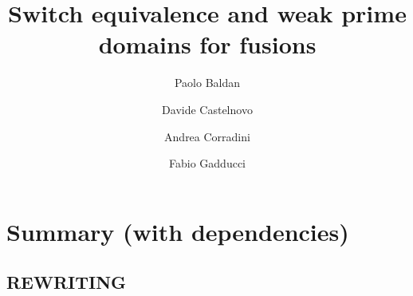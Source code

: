 \documentclass[a4paper]{article}
\title{Switch equivalence and weak prime domains for fusions}
\author{Paolo Baldan\and Davide Castelnovo\and  Andrea Corradini\and Fabio Gadducci}
\theoremstyle{definition}
\begin{document}
\maketitle



\begin{abstract}
\end{abstract}

\tableofcontents

\section*{Summary (with dependencies)}

\subsection*{REWRITING}
\end{document}
